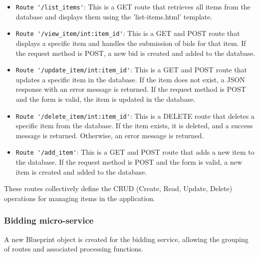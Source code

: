 \documentclass[12pt]{article}
\begin{document}
\begin{itemize}
    \item \verb|Route '/list_items'|: This is a GET route that retrieves all items from the database and displays them using the 'list-items.html' template.
    
    \item \verb|Route '/view_item/int:item_id'|: This is a GET and POST route that displays a specific item and handles the submission of bids for that item. If the request method is POST, a new bid is created and added to the database.
    
    \item \verb|Route '/update_item/int:item_id'|: This is a GET and POST route that updates a specific item in the database. If the item does not exist, a JSON response with an error message is returned. If the request method is POST and the form is valid, the item is updated in the database.
    
    \item \verb|Route '/delete_item/int:item_id'|: This is a DELETE route that deletes a specific item from the database. If the item exists, it is deleted, and a success message is returned. Otherwise, an error message is returned.
    
    \item \verb|Route '/add_item'|: This is a GET and POST route that adds a new item to the database. If the request method is POST and the form is valid, a new item is created and added to the database.
\end{itemize}


These routes collectively define the CRUD (Create, Read, Update, Delete) operations for managing items in the application.

\subsubsection{Bidding micro-service}
A new Blueprint object is created for the bidding service, allowing the grouping of routes and associated processing functions.
\end{document}
